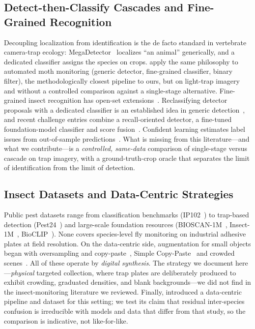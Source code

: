 \subsection{Detect-then-Classify Cascades and Fine-Grained Recognition}

Decoupling localization from identification is the de facto standard in vertebrate camera-trap ecology: MegaDetector~\cite{beery2019} localizes ``an animal'' generically, and a dedicated classifier assigns the species on crops. \cite{jain2024} apply the same philosophy to automated moth monitoring (generic detector, fine-grained classifier, binary filter), the methodologically closest pipeline to ours, but on light-trap imagery and without a controlled comparison against a single-stage alternative. Fine-grained insect recognition has open-set extensions~\cite{opensect2025}. Reclassifying detector proposals with a dedicated classifier is an established idea in generic detection~\cite{cheng2018dcr,cai2018cascade}, and recent challenge entries combine a recall-oriented detector, a fine-tuned foundation-model classifier and score fusion~\cite{brock2026fathomnet}. Confident learning estimates label issues from out-of-sample predictions~\cite{northcutt2021confident,chachula2023clod}. What is missing from this literature---and what we contribute---is a \emph{controlled, same-data} comparison of single-stage versus cascade on trap imagery, with a ground-truth-crop oracle that separates the limit of identification from the limit of detection.

\subsection{Insect Datasets and Data-Centric Strategies}

Public pest datasets range from classification benchmarks (IP102~\cite{wu2019ip102}) to trap-based detection (Pest24~\cite{wang2020pest24}) and large-scale foundation resources (BIOSCAN-1M~\cite{bioscan2023}, Insect-1M~\cite{insect1m2024}, BioCLIP~\cite{bioclip2024}). None covers species-level fly monitoring on industrial adhesive plates at field resolution. On the data-centric side, augmentation for small objects began with oversampling and copy-paste~\cite{kisantal2019}, Simple Copy-Paste~\cite{ghiasi2021} and crowded scenes~\cite{deng2023crowded}. All of these operate by \emph{digital synthesis}. The strategy we document here---\emph{physical} targeted collection, where trap plates are deliberately produced to exhibit crowding, graduated densities, and blank backgrounds---we did not find in the insect-monitoring literature we reviewed. Finally, \cite{pacbb2026} introduced a data-centric pipeline and dataset for this setting; we test its claim that residual inter-species confusion is irreducible with models and data that differ from that study, so the comparison is indicative, not like-for-like.
